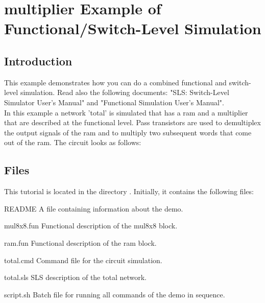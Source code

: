 \chapter{multiplier Example of Functional/Switch-Level Simulation}
\section{Introduction}
\label{PEintro}
This example demonstrates how you can do a combined functional and switch-level simulation.
Read also the following documents: "SLS: Switch-Level Simulator User's Manual"
and "Functional Simulation User's Manual".
\\[1 ex]
In this example a network 'total' is simulated that has a ram and a
multiplier that are described at the functional level.
Pass transistors are used to demultiplex the output
signals of the ram and to multiply two subsequent
words that come out of the ram.
The circuit looks as follows:

\begin{figure}[h]
\centerline{}
\end{figure}

\section{Files}
This tutorial is located in the directory .
Initially, it contains the following files:
\begin{filelist}
\item[README] A file containing information about the demo.
\item[mul8x8.fun] Functional description of the mul8x8 block.
\item[ram.fun] Functional description of the ram block.
\item[total.cmd] Command file for the circuit simulation.
\item[total.sls] SLS description of the total network.
\item[script.sh] Batch file for running all commands of the demo in sequence.
\end{filelist}

